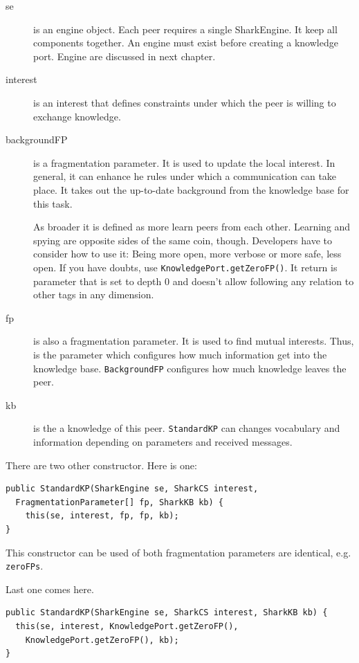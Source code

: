 {\begin{description}
\item[se] is an engine object. Each peer requires a single SharkEngine. It keep all components together. An engine must exist before creating a knowledge port. Engine are discussed in next chapter.

\item[interest] is an interest that defines constraints under which the peer is willing to exchange knowledge. 

\item[backgroundFP] is a fragmentation parameter. It is used to update the local interest. In general, it can enhance he rules under which a communication can take place. It takes out the up-to-date background from the knowledge base for this task. 

As broader it is defined as more learn peers from each other. Learning and spying are opposite sides of the same coin, though. Developers have to consider how to use it: Being more open, more verbose or more safe, less open. If you have doubts, use {\tt KnowledgePort.getZeroFP()}. It return is parameter that is set to depth 0 and doesn't allow following any relation to other tags in any dimension.

\item[fp] is also a fragmentation parameter. It is used to find mutual interests. Thus, is the parameter which configures how much information get into the knowledge base. {\tt BackgroundFP} configures how much knowledge leaves the peer.

\item[kb] is the a knowledge of this peer. {\tt StandardKP} can changes vocabulary and information depending on parameters and received messages.
\end{description}

There are two other constructor. Here is one:
\begin{verbatim}
public StandardKP(SharkEngine se, SharkCS interest, 
  FragmentationParameter[] fp, SharkKB kb) {
    this(se, interest, fp, fp, kb);
}
\end{verbatim}

This constructor can be used of both fragmentation parameters are identical, e.g. {\tt zeroFPs}.

Last one comes here.
\begin{verbatim}
public StandardKP(SharkEngine se, SharkCS interest, SharkKB kb) {
  this(se, interest, KnowledgePort.getZeroFP(), 
    KnowledgePort.getZeroFP(), kb);
}
\end{verbatim}

}
